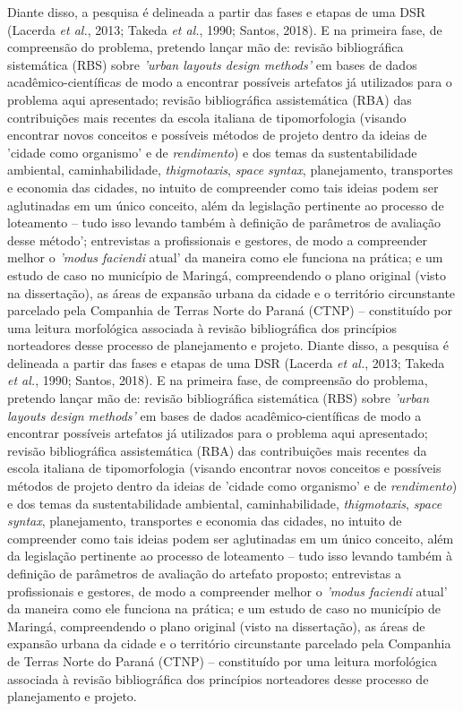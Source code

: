 \documentclass[]{report}
\begin{document}
    Diante disso, a pesquisa é delineada a partir das fases e etapas de uma DSR (Lacerda \textit{et al.}, 2013; Takeda \textit{et al.}, 1990; Santos, 2018). E na primeira fase, de compreensão do problema, pretendo lançar mão de: revisão bibliográfica sistemática (RBS) sobre \textit{'urban layouts design methods'} em bases de dados acadêmico-científicas de modo a encontrar possíveis artefatos já utilizados para o problema aqui apresentado; revisão bibliográfica assistemática (RBA) das contribuições mais recentes da escola italiana de tipomorfologia (visando encontrar novos conceitos e possíveis métodos de projeto dentro da ideias de 'cidade como organismo' e de \textit{rendimento}) e dos temas da sustentabilidade ambiental, caminhabilidade, \textit{thigmotaxis}, \textit{space syntax}, planejamento, transportes e economia das cidades, no intuito de compreender como tais ideias podem ser aglutinadas em um único conceito, além da legislação pertinente ao processo de loteamento – tudo isso levando também à definição de parâmetros de avaliação desse método';  entrevistas a profissionais e gestores, de modo a compreender melhor o \textit{'modus faciendi} atual' da maneira como ele funciona na prática; e um estudo de caso no município de Maringá, compreendendo o plano original (visto na dissertação), as áreas de expansão urbana da cidade e o território circunstante parcelado pela Companhia de Terras Norte do Paraná (CTNP) – constituído por uma leitura morfológica associada à revisão bibliográfica dos princípios norteadores desse processo de planejamento e projeto.
    Diante disso, a pesquisa é delineada a partir das fases e etapas de uma DSR (Lacerda \textit{et al.}, 2013; Takeda \textit{et al.}, 1990; Santos, 2018). E na primeira fase, de compreensão do problema, pretendo lançar mão de: revisão bibliográfica sistemática (RBS) sobre \textit{'urban layouts design methods'} em bases de dados acadêmico-científicas de modo a encontrar possíveis artefatos já utilizados para o problema aqui apresentado; revisão bibliográfica assistemática (RBA) das contribuições mais recentes da escola italiana de tipomorfologia (visando encontrar novos conceitos e possíveis métodos de projeto dentro da ideias de 'cidade como organismo' e de \textit{rendimento}) e dos temas da sustentabilidade ambiental, caminhabilidade, \textit{thigmotaxis}, \textit{space syntax}, planejamento, transportes e economia das cidades, no intuito de compreender como tais ideias podem ser aglutinadas em um único conceito, além da legislação pertinente ao processo de loteamento – tudo isso levando também à definição de parâmetros de avaliação do artefato proposto;  entrevistas a profissionais e gestores, de modo a compreender melhor o \textit{'modus faciendi} atual' da maneira como ele funciona na prática; e um estudo de caso no município de Maringá, compreendendo o plano original (visto na dissertação), as áreas de expansão urbana da cidade e o território circunstante parcelado pela Companhia de Terras Norte do Paraná (CTNP) – constituído por uma leitura morfológica associada à revisão bibliográfica dos princípios norteadores desse processo de planejamento e projeto.
 
\end{document}
